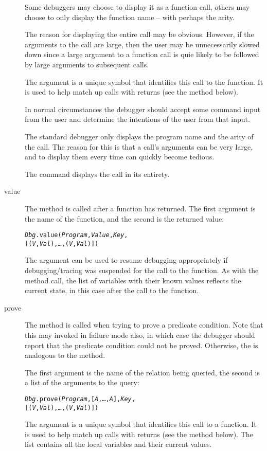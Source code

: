 \begin{description}
Some debuggers may choose to display it as a function call, others may choose to only display the function name -- with perhaps the arity.

\begin{aside}
The reason for displaying the entire call may be obvious. However, if the arguments to the call are large, then the user may be unnecessarily slowed down since a large argument to a function call is quie likely to be followed by large arguments to subsequent calls.
\end{aside}

The  argument is a unique symbol that identifies this call to the function. It is used to help match up calls with returns (see the  method below).

In normal circumstances the debugger should accept some command input from the user and determine the intentions of the user from that input.

\begin{aside}
The standard debugger only displays the program name and the arity of the call. The reason for this is that a call's arguments can be very large, and to display them every time can quickly become tedious.

The  command displays the call in its entirety.
\end{aside}

\item[value]
The  method is called after a function has returned. The first argument is the name of the function, and the second is the returned value:
\begin{alltt}
\emph{Dbg}.value(\emph{Program},\emph{Value},\emph{Key},
          [(\emph{V},\emph{Val}),\ldots,(\emph{V\subn},\emph{Val\subn})])
\end{alltt}
The  argument can be used to resume debugging appropriately if debugging/tracing was suspended for the call to the function. As with the  method call, the list of variables with their known values reflects the current state, in this case after the call to the function.


\item[prove]
The  method is called when trying to prove a predicate condition. Note that this may invoked in failure mode also, in which case the debugger should report that the predicate condition could not be proved. Otherwise, the  is analogous to the  method.

The first argument is the name of the relation being queried, the second is a list of the arguments to the query:
\begin{alltt}
\emph{Dbg}.prove(\emph{Program},[\emph{A},\ldots,\emph{A\subn}],\emph{Key},
          [(\emph{V},\emph{Val}),\ldots,(\emph{V\subn},\emph{Val\subn})])
\end{alltt}
The  argument is a unique symbol that identifies this call to a function. It is used to help match up calls with returns (see the  method below). The  list contains all the local variables and their current values.


\end{description}
